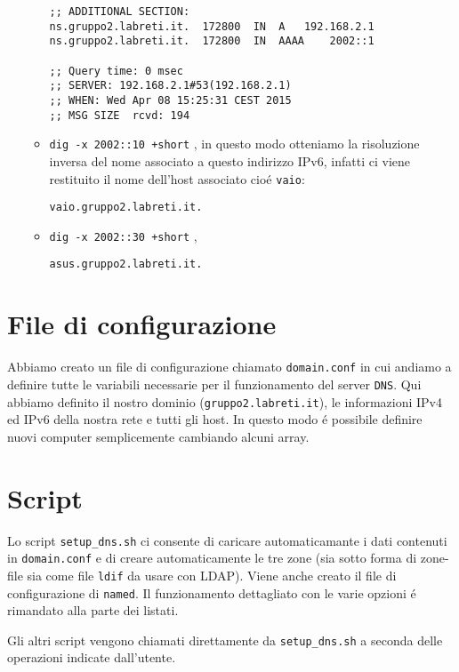 \documentclass[9pt, a4paper, oneside]{article}
\begin{document}
\begin{itemize}
\begin{itemize}
\begin{verbatim}
;; ADDITIONAL SECTION:
ns.gruppo2.labreti.it.	172800	IN	A	192.168.2.1
ns.gruppo2.labreti.it.	172800	IN	AAAA	2002::1

;; Query time: 0 msec
;; SERVER: 192.168.2.1#53(192.168.2.1)
;; WHEN: Wed Apr 08 15:25:31 CEST 2015
;; MSG SIZE  rcvd: 194

								\end{verbatim}
							\item
								\texttt{dig -x 2002::10 +short} , 
								in questo modo 
								otteniamo la 
								risoluzione 
								inversa del 
								nome associato 
								a questo 
								indirizzo 
								IPv6, infatti 
								ci viene 
								restituito il 
								nome dell'host 
								associato 
								cio\'e
								\texttt{vaio}:
								\begin{verbatim}
vaio.gruppo2.labreti.it.
								\end{verbatim}
							\item
								\texttt{dig -x 2002::30 +short} , 
								\begin{verbatim}
asus.gruppo2.labreti.it.	
								\end{verbatim}
						\end{itemize}
				\end{itemize}
		\section{File di configurazione}
			\par			
				Abbiamo creato un file di 
				configurazione chiamato \texttt{domain.conf} in 
				cui andiamo a definire tutte le variabili 
				necessarie per il funzionamento del server 
				\texttt{DNS}. Qui abbiamo definito il nostro 
				dominio (\texttt{gruppo2.labreti.it}), le 
				informazioni IPv4 ed IPv6 della nostra rete e 
				tutti gli host. In questo modo \'e possibile 
				definire nuovi computer semplicemente cambiando 
				alcuni array.
		\section{Script}
			\par
				Lo script \texttt{setup\_dns.sh} ci consente di 
				caricare automaticamante i dati contenuti in 
				\texttt{domain.conf} e di creare 
				automaticamente le tre zone (sia sotto 
				forma di zone-file sia come file 
				\texttt{ldif} da usare con LDAP). Viene anche 
				creato il file di configurazione di 
				\texttt{named}. Il funzionamento dettagliato 
				con le varie opzioni \'e rimandato alla parte 
				dei listati.
			\par
				Gli altri script vengono chiamati direttamente 
				da \texttt{setup\_dns.sh} a seconda delle 
				operazioni indicate dall'utente.
		\newpage
\end{document}
